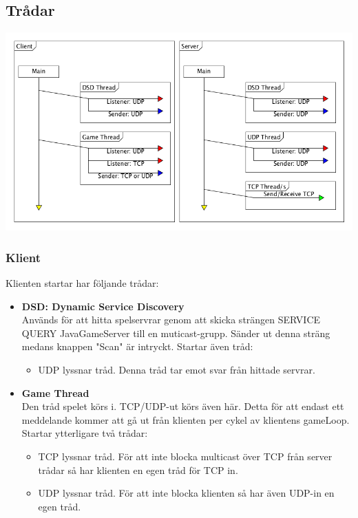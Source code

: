 \documentclass[10pt, titlepage, oneside, a4paper]{article}
\begin{document}
		\newpage
		\subsection{Trådar}
			\begin{center}
				\includegraphics[scale=.4]{./documentation/images/threads.png}
			\end{center}
			\subsubsection{Klient}
				Klienten startar har följande trådar:
				\begin{itemize}
					\item \textbf{DSD: Dynamic Service Discovery}\\ Används för att hitta spelservrar genom att skicka strängen SERVICE QUERY JavaGameServer till en muticast-grupp. Sänder ut denna sträng medans knappen "Scan" är intryckt. Startar även tråd:
					\begin{itemize}
						\item UDP lyssnar tråd. Denna tråd tar emot svar från hittade servrar.
					\end{itemize}
					
					\item \textbf{Game Thread}\\Den tråd spelet körs i. TCP/UDP-ut körs även här. Detta för att endast ett meddelande kommer att gå ut från klienten per cykel av klientens gameLoop. Startar ytterligare två trådar:
						\begin{itemize}
							\item TCP lyssnar tråd. För att inte blocka multicast över TCP från server trådar så har klienten en egen tråd för TCP in.
							\item UDP lyssnar tråd. För att inte blocka klienten så har även UDP-in en egen tråd.
							
						\end{itemize}
				\end{itemize}
			\newpage
\end{document}
